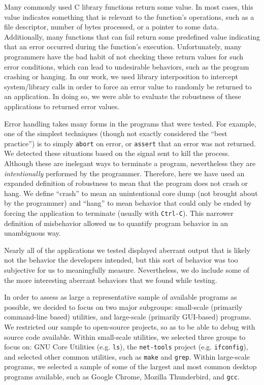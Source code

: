 Many commonly used C library functions return some value. In most cases, this value indicates something that is relevant to the  function's operations, such as a file descriptor, number of bytes processed, or a pointer to some data. Additionally, many functions that can fail return some predefined value indicating that an error occurred during the function's execution. Unfortunately, many programmers have the bad habit of not checking these return values for such error conditions, which can lead to undesirable behaviors, such as the program crashing or hanging. In our work, we used library interposition to intercept system/library calls in order to force an error value to randomly be returned to an application. In doing so, we were able to evaluate the robustness of these applications to returned error values.

Error handling takes many forms in the programs that were tested. For example, one of the simplest techniques (though not exactly considered the ``best practice'') is to simply \texttt{abort} on error, or \texttt{assert} that an error was not returned. We detected these situations based on the signal sent to kill the process. Although these are inelegant ways to terminate a program, nevertheless they are \emph{intentionally} performed by the programmer. Therefore, here we have used an expanded definition of robustness to mean that the program does not crash or hang. We define ``crash'' to mean an unintentional core dump (not brought about by the programmer) and ``hang'' to mean behavior that could only be ended by forcing the application to terminate (usually with \texttt{Ctrl-C}). This narrower definition of misbehavior allowed us to quantify program behavior in an unambiguous way.

Nearly all of the applications we tested displayed aberrant output that is likely not the behavior the developers intended, but this sort of behavior was too subjective for us to meaningfully measure. Nevertheless, we do include some of the more interesting aberrant behaviors that we found while testing.

In order to assess as large a representative sample of available programs as possible, we decided to focus on two major subgroups: small-scale (primarily command-line based) utilities, and large-scale (primarily GUI-based) programs. We restricted our sample to open-source projects, so as to be able to debug with source code available. Within small-scale utilities, we selected three groups to focus on: GNU Core Utilities (e.g. \texttt{ls}), the \texttt{net-tools} project (e.g. \texttt{ifconfig}), and selected other common utilities, such as \texttt{make} and \texttt{grep}. Within large-scale programs, we selected a sample of some of the largest and most common desktop programs available, such as Google Chrome, Mozilla Thunderbird, and \texttt{gcc}.
